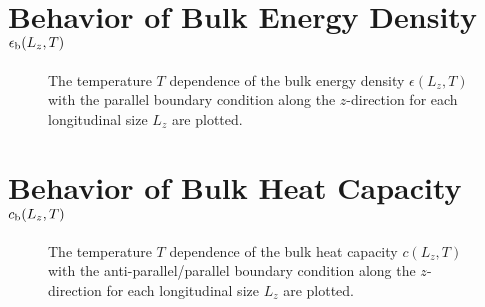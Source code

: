 \section{Behavior of Bulk Energy Density $\epsilon_{\rm b}(L_{z}, T)$}
\begin{figure}[htbp]
	\centering
	
	\caption{The temperature $T$ dependence of the bulk energy density $\epsilon(L_{z}, T)$ with the parallel boundary condition along the $z$-direction for each longitudinal size $L_{z}$ are plotted.}
\end{figure}

\section{Behavior of Bulk Heat Capacity $c_{\rm b}(L_{z}, T)$}
\begin{figure}[htbp]
	\centering
	
	\caption{The temperature $T$ dependence of the bulk heat capacity $c(L_{z}, T)$ with the anti-parallel/parallel boundary condition along the $z$-direction for each longitudinal size $L_{z}$ are plotted.}
\end{figure}